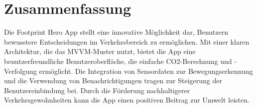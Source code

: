 \documentclass{article}
\begin{document}
    


\section{Zusammenfassung}

Die Footprint Hero App stellt eine innovative Möglichkeit dar, Benutzern bewusstere Entscheidungen im Verkehrsbereich zu ermöglichen. Mit einer klaren Architektur, die das MVVM-Muster nutzt, bietet die App eine benutzerfreundliche Benutzeroberfläche, die einfache CO2-Berechnung und -Verfolgung ermöglicht. Die Integration von Sensordaten zur Bewegungserkennung und die Verwendung von Benachrichtigungen tragen zur Steigerung der Benutzereinbindung bei. Durch die Förderung nachhaltigerer Verkehrsgewohnheiten kann die App einen positiven Beitrag zur Umwelt leisten.
\end{document}
